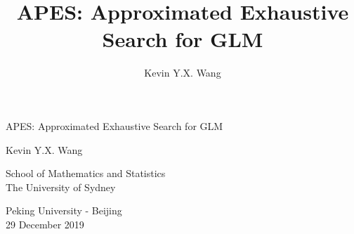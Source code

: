 \documentclass[12pt,aspectratio=169]{beamer}
\title{APES: Approximated Exhaustive Search for GLM}
\author{Kevin Y.X. Wang}
\begin{document}


\begin{frame}
\begin{center}
	{\Large \color{myBlue} APES: Approximated Exhaustive Search for GLM}
	
	\vspace{1cm}
	
	{\normalsize  Kevin Y.X. Wang}
	
	\vspace{0.5cm}
	
	{\footnotesize School of Mathematics and Statistics \\ The University of Sydney}

	\vspace{1cm}

	{\normalsize Peking University - Beijing \\ 29 December 2019}

	\vspace{1cm}
\begin{columns}
	\begin{column}{0.5\linewidth}
	\end{column}
	\begin{column}{0.5\linewidth}
	\end{column}
\end{columns}
\end{center}
\end{frame}
\end{document}
